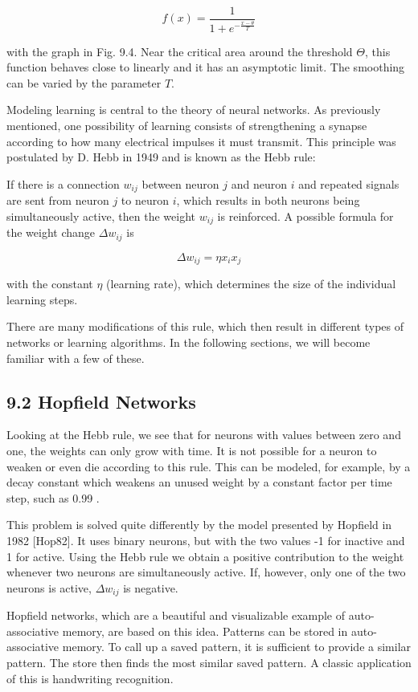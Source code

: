 \documentclass[10pt]{book}
\begin{document}
\begin{center}
\begin{enumerate}
\begin{center}
\begin{center}
\begin{center}
$$
f(x)=\frac{1}{1+e^{-\frac{x-\theta}{T}}}
$$

with the graph in Fig. 9.4. Near the critical area around the threshold $\Theta$, this function behaves close to linearly and it has an asymptotic limit. The smoothing can be varied by the parameter $T$.

Modeling learning is central to the theory of neural networks. As previously mentioned, one possibility of learning consists of strengthening a synapse according to how many electrical impulses it must transmit. This principle was postulated by D. Hebb in 1949 and is known as the Hebb rule:

If there is a connection $w_{i j}$ between neuron $j$ and neuron $i$ and repeated signals are sent from neuron $j$ to neuron $i$, which results in both neurons being simultaneously active, then the weight $w_{i j}$ is reinforced. A possible formula for the weight change $\Delta w_{i j}$ is

$$
\Delta w_{i j}=\eta x_{i} x_{j}
$$

with the constant $\eta$ (learning rate), which determines the size of the individual learning steps.

There are many modifications of this rule, which then result in different types of networks or learning algorithms. In the following sections, we will become familiar with a few of these.

\subsection*{9.2 Hopfield Networks}
Looking at the Hebb rule, we see that for neurons with values between zero and one, the weights can only grow with time. It is not possible for a neuron to weaken or even die according to this rule. This can be modeled, for example, by a decay constant which weakens an unused weight by a constant factor per time step, such as 0.99 .

This problem is solved quite differently by the model presented by Hopfield in 1982 [Hop82]. It uses binary neurons, but with the two values -1 for inactive and 1 for active. Using the Hebb rule we obtain a positive contribution to the weight whenever two neurons are simultaneously active. If, however, only one of the two neurons is active, $\Delta w_{i j}$ is negative.

Hopfield networks, which are a beautiful and visualizable example of auto-associative memory, are based on this idea. Patterns can be stored in auto-associative memory. To call up a saved pattern, it is sufficient to provide a similar pattern. The store then finds the most similar saved pattern. A classic application of this is handwriting recognition.


\end{center}
\end{center}
\end{center}
\end{enumerate}
\end{center}
\end{document}
